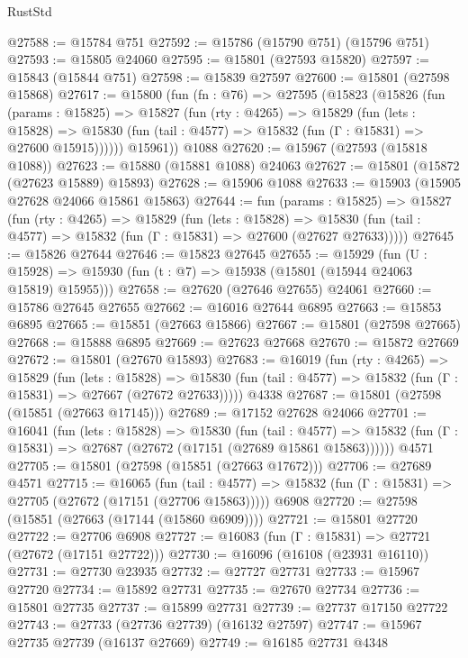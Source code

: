 \begin{lexlean}{RustStd}
\begin{coremodule}
@27588 := @15784 @751
@27592 := @15786 (@15790 @751) (@15796 @751)
@27593 := @15805 @24060
@27595 := @15801 (@27593 @15820)
@27597 := @15843 (@15844 @751)
@27598 := @15839 @27597
@27600 := @15801 (@27598 @15868)
@27617 := @15800
    (fun (fn : @76) =>
    @27595
      (@15823
        (@15826
          (fun (params : @15825) =>
          @15827
            (fun (rty : @4265) =>
            @15829
              (fun (lets : @15828) =>
              @15830 (fun (tail : @4577) => @15832 (fun (Γ : @15831) => @27600 @15915))))))
        @15961))
    @1088
@27620 := @15967 (@27593 (@15818 @1088))
@27623 := @15880 (@15881 @1088) @24063
@27627 := @15801 (@15872 (@27623 @15889) @15893)
@27628 := @15906 @1088
@27633 := @15903 (@15905 @27628 @24066 @15861 @15863)
@27644 := fun (params : @15825) =>
  @15827
    (fun (rty : @4265) =>
    @15829
      (fun (lets : @15828) =>
      @15830 (fun (tail : @4577) => @15832 (fun (Γ : @15831) => @27600 (@27627 @27633)))))
@27645 := @15826 @27644
@27646 := @15823 @27645
@27655 := @15929
    (fun (U : @15928) => @15930 (fun (t : @7) => @15938 (@15801 (@15944 @24063 @15819) @15955)))
@27658 := @27620 (@27646 @27655) @24061
@27660 := @15786 @27645 @27655
@27662 := @16016 @27644 @6895
@27663 := @15853 @6895
@27665 := @15851 (@27663 @15866)
@27667 := @15801 (@27598 @27665)
@27668 := @15888 @6895
@27669 := @27623 @27668
@27670 := @15872 @27669
@27672 := @15801 (@27670 @15893)
@27683 := @16019
    (fun (rty : @4265) =>
    @15829
      (fun (lets : @15828) =>
      @15830 (fun (tail : @4577) => @15832 (fun (Γ : @15831) => @27667 (@27672 @27633)))))
    @4338
@27687 := @15801 (@27598 (@15851 (@27663 @17145)))
@27689 := @17152 @27628 @24066
@27701 := @16041
    (fun (lets : @15828) =>
    @15830
      (fun (tail : @4577) =>
      @15832 (fun (Γ : @15831) => @27687 (@27672 (@17151 (@27689 @15861 @15863))))))
    @4571
@27705 := @15801 (@27598 (@15851 (@27663 @17672)))
@27706 := @27689 @4571
@27715 := @16065
    (fun (tail : @4577) => @15832 (fun (Γ : @15831) => @27705 (@27672 (@17151 (@27706 @15863)))))
    @6908
@27720 := @27598 (@15851 (@27663 (@17144 (@15860 @6909))))
@27721 := @15801 @27720
@27722 := @27706 @6908
@27727 := @16083 (fun (Γ : @15831) => @27721 (@27672 (@17151 @27722)))
@27730 := @16096 (@16108 (@23931 @16110))
@27731 := @27730 @23935
@27732 := @27727 @27731
@27733 := @15967 @27720
@27734 := @15892 @27731
@27735 := @27670 @27734
@27736 := @15801 @27735
@27737 := @15899 @27731
@27739 := @27737 @17150 @27722
@27743 := @27733 (@27736 @27739) (@16132 @27597)
@27747 := @15967 @27735 @27739 (@16137 @27669)
@27749 := @16185 @27731 @4348

\end{coremodule}
\end{lexlean}
